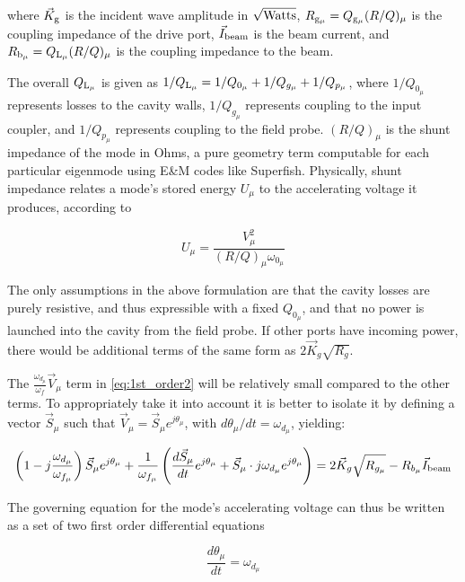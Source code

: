 \documentclass[a4paper,12pt]{article}
\begin{document}
\noindent where $\vec K_{\rm g}$ is the incident wave amplitude in $\sqrt{\rm Watts}$, $R_{\rm g_{\mu}}=Q_{\rm g_{\mu}}(R/Q)_{\mu}$ is the coupling impedance of the drive port, $\vec I_{\rm beam}$ is the beam current, and $R_{\rm b_{\mu}}=Q_{\rm L_{\mu}}(R/Q)_{\mu}$ is the coupling impedance to the beam.

The overall $Q_{\rm L_{\mu}}$ is given as $1/Q_{\rm L_{\mu}}=1/Q_{0_{\mu}}+1/Q_{g_{\mu}}+1/Q_{p_{\mu}}$, where $1/Q_{0_{\mu}}$ represents losses to the cavity walls, $1/Q_{g_{\mu}}$ represents coupling to the input coupler, and $1/Q_{p_{\mu}}$ represents coupling to the field probe. $(R/Q)_{\mu}$ is the shunt impedance of the mode in Ohms, a pure geometry term computable for each particular eigenmode using E\&M codes like Superfish. Physically, shunt impedance relates a mode's stored energy $U_{\mu}$ to the accelerating voltage it produces, according to 

\begin{equation}
  U_{\mu} = \frac{V_{\mu}^2}{(R/Q)_{\mu}\omega_{0_{\mu}}}
\end{equation}

The only assumptions in the above formulation are that the cavity losses are purely resistive, and thus expressible with a fixed $Q_{0_{\mu}}$, and that no power is launched into the cavity from the field probe.  If other ports have incoming power, there would be additional terms of the same form as $2\vec K_g\sqrt{R_g}$.

The $\frac{\omega_{d_\mu}}{\omega_{f}}\vec{V}_{\mu}$ term in \ref{eq:1st_order2} will be relatively small compared to the other terms. To appropriately take it into account it is better to isolate it by defining  a vector $\vec{S}_{\mu}$ such that $\vec{V}_{\mu} = \vec{S}_{\mu}e^{j\theta_{\mu}}$, with $d\theta_{\mu}/dt = \omega_{d_{\mu}}$, yielding: 

\begin{equation}
\left(1 - j\frac{\omega_{d_\mu}}{\omega_{f_{\mu}}}\right)\vec{S}_{\mu}e^{j\theta_{\mu}} + \frac{1}{\omega_{f_{\mu}}}
    \left(\frac{d\vec{S}_{\mu}}{dt}e^{j\theta_{\mu}} + \vec{S}_{\mu} \cdot j\omega_{d_{\mu}}e^{j\theta_{\mu}}\right) = 2\vec{K}_{g}\sqrt{R_{g_{\mu}}} - R_{b_{\mu}}\vec{I}_{\rm beam}
\label{eq Gov_S}
\end{equation}

\noindent The governing equation for the mode's accelerating voltage can thus be written as a set of two first order differential equations

\begin{equation}
\frac{d\theta_{\mu}}{dt} = \omega_{d_\mu}
\label{eq: d0_dt}
\end{equation}
\end{document}

